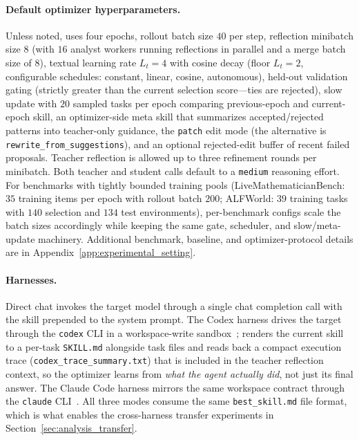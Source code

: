 \paragraph{Default optimizer hyperparameters.}
Unless noted, \ourmethod{} uses four epochs, rollout batch size $40$ per step, reflection minibatch size $8$ (with $16$ analyst workers running reflections in parallel and a merge batch size of $8$), textual learning rate $L_t=4$ with cosine decay (floor $L_t=2$, configurable schedules: constant, linear, cosine, autonomous), held-out validation gating (strictly greater than the current selection score---ties are rejected), slow update with $20$ sampled tasks per epoch comparing previous-epoch and current-epoch skill, an optimizer-side meta skill that summarizes accepted/rejected patterns into teacher-only guidance, the \texttt{patch} edit mode (the alternative is \texttt{rewrite\_from\_suggestions}), and an optional rejected-edit buffer of recent failed proposals. Teacher reflection is allowed up to three refinement rounds per minibatch. Both teacher and student calls default to a \texttt{medium} reasoning effort. For benchmarks with tightly bounded training pools (LiveMathematicianBench: $35$ training items per epoch with rollout batch $200$; ALFWorld: $39$ training tasks with $140$ selection and $134$ test environments), per-benchmark configs scale the batch sizes accordingly while keeping the same gate, scheduler, and slow/meta-update machinery. Additional benchmark, baseline, and optimizer-protocol details are in Appendix~\ref{app:experimental_setting}.

\paragraph{Harnesses.}
Direct chat invokes the target model through a single chat completion call with the skill prepended to the system prompt. The Codex harness drives the target through the \texttt{codex} CLI in a workspace-write sandbox~\citep{openai2025codex}; \ourmethod{} renders the current skill to a per-task \texttt{SKILL.md} alongside task files and reads back a compact execution trace (\texttt{codex\_trace\_summary.txt}) that is included in the teacher reflection context, so the optimizer learns from \emph{what the agent actually did}, not just its final answer. The Claude Code harness mirrors the same workspace contract through the \texttt{claude} CLI~\citep{anthropic2025claudecode}. All three modes consume the same \texttt{best\_skill.md} file format, which is what enables the cross-harness transfer experiments in Section~\ref{sec:analysis_transfer}.

